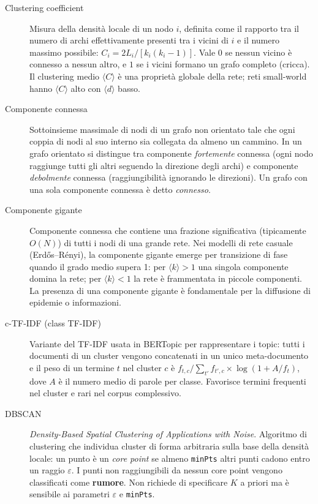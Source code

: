 \documentclass[12pt,a4paper]{article}
\begin{document}
\begin{description}
  \item[Clustering coefficient] Misura della densità locale di un nodo $i$, definita come
  il rapporto tra il numero di archi effettivamente presenti tra i vicini di $i$ e il
  numero massimo possibile: $C_i = 2L_i / [k_i(k_i-1)]$. Vale $0$ se nessun vicino è
  connesso a nessun altro, e $1$ se i vicini formano un grafo completo (cricca). Il
  clustering medio $\langle C \rangle$ è una proprietà globale della rete; reti
  small-world hanno $\langle C \rangle$ alto con $\langle d \rangle$ basso.

  \item[Componente connessa] Sottoinsieme massimale di nodi di un grafo non orientato tale
  che ogni coppia di nodi al suo interno sia collegata da almeno un cammino. In un grafo
  orientato si distingue tra componente \textit{fortemente} connessa (ogni nodo raggiunge
  tutti gli altri seguendo la direzione degli archi) e componente \textit{debolmente}
  connessa (raggiungibilità ignorando le direzioni). Un grafo con una sola componente
  connessa è detto \textit{connesso}.

  \item[Componente gigante] Componente connessa che contiene una frazione significativa
  (tipicamente $O(N)$) di tutti i nodi di una grande rete. Nei modelli di rete casuale
  (Erdős–Rényi), la componente gigante emerge per transizione di fase quando il grado
  medio supera 1: per $\langle k \rangle > 1$ una singola componente domina la rete;
  per $\langle k \rangle < 1$ la rete è frammentata in piccole componenti. La presenza
  di una componente gigante è fondamentale per la diffusione di epidemie o informazioni.

  \item[c-TF-IDF (class TF-IDF)] Variante del TF-IDF usata in BERTopic per rappresentare
  i topic: tutti i documenti di un cluster vengono concatenati in un unico meta-documento
  e il peso di un termine $t$ nel cluster $c$ è $f_{t,c}/\sum_{t'}f_{t',c} \times
  \log(1+A/f_t)$, dove $A$ è il numero medio di parole per classe. Favorisce termini
  frequenti nel cluster e rari nel corpus complessivo.

  \item[DBSCAN] \textit{Density-Based Spatial Clustering of Applications with Noise}.
  Algoritmo di clustering che individua cluster di forma arbitraria sulla base della
  densità locale: un punto è un \textit{core point} se almeno \texttt{minPts} altri
  punti cadono entro un raggio $\varepsilon$. I punti non raggiungibili da nessun core
  point vengono classificati come \textbf{rumore}. Non richiede di specificare $K$ a
  priori ma è sensibile ai parametri $\varepsilon$ e \texttt{minPts}.


\end{description}
\end{document}
